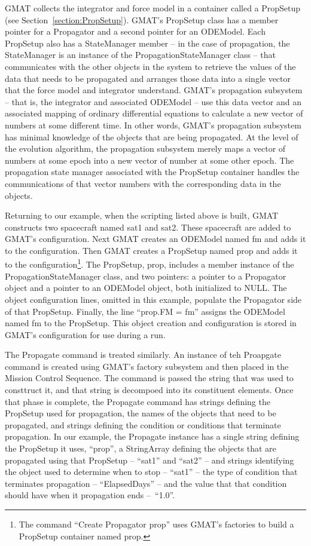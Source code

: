 \noindent GMAT collects the integrator and force model in a container called a PropSetup (see
Section~\ref{section:PropSetup}).  GMAT's PropSetup class has a member pointer for a Propagator and
a second pointer for an ODEModel.  Each PropSetup also has a StateManager member -- in the case of
propagation, the StateManager is an instance of the PropagationStateManager class -- that
communicates with the other objects in the system to retrieve the values of the data that needs to
be propagated and arranges those data into a single vector that the force model and integrator
understand. GMAT's propagation subsystem -- that is, the integrator and associated ODEModel -- use
this data vector and an associated mapping of ordinary differential equations to calculate a new
vector of numbers at some different time.  In other words, GMAT's propagation subsystem has minimal
knowledge of the objects that are being propagated.  At the level of the evolution algorithm, the
propagation subsystem merely maps a vector of numbers at some epoch into a new vector of number at
some other epoch.  The propagation state manager associated with the PropSetup container handles
the communications of that vector numbers with the corresponding data in the objects.

Returning to our example, when the scripting listed above is built, GMAT constructs two spacecraft
named sat1 and sat2.  These spacecraft are added to GMAT's configuration.  Next GMAT creates an
ODEModel named fm and adds it to the configuration.  Then GMAT creates a PropSetup named prop and
 adds it to the configuration\footnote{The command ``Create Propagator prop'' uses GMAT's factories
to build a PropSetup container named prop.}.  The PropSetup, prop, includes a member instance of the
PropagationStateManager class, and two pointers: a pointer to a Propagator object and a pointer to
an ODEModel object, both initialized to NULL.  The object configuration lines, omitted in this
example, populate the Propagator side of that PropSetup.  Finally, the line ``prop.FM = fm''
assigns the ODEModel named fm to the PropSetup.  This object creation and configuration is stored
in GMAT's configuration for use during a run.

The Propagate command is treated similarly.  An instance of teh Proapgate command is created using
GMAT's factory subsystem and then placed in the Mission Control Sequence.  The command is passed
the string that was used to consttruct it, and that string is decompoed into its constituent
elements.  Once that phase is complete, the Propagate command has strings defining the PropSetup
used for propagation, the names of the objects that need to be propagated, and strings defining the
condition or conditions that terminate propagation.  In our example, the Propagate instance has a
single string defining the PropSetup it uses, ``prop'', a StringArray defining the objects that are
propagated using that PropSetup -- ``sat1'' and ``sat2'' -- and strings identifying the object used
to determine when to stop -- ``sat1'' -- the type of condition that terminates propagation --
``ElapsedDays'' -- and the value that that condition should have when it propagation ends
--~``1.0''.

